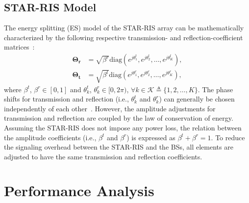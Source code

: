 \documentclass[conference]{IEEEtran}
\begin{document}
\subsection{STAR-RIS Model}
The energy splitting (ES) model of the STAR-RIS array can be mathematically characterized by the following respective transmission- and reflection-coefficient matrices~\cite{mu2021simultaneously}:
\begin{align}
	\mathbf{\Theta_r} & = \sqrt{\beta^r}\text{diag}(e^{j \theta_1^t}, e^{j \theta_2^t}, \dots, e^{j \theta_K^t}), \\
	\mathbf{\Theta_t} & = \sqrt{\beta^t}\text{diag}(e^{j \theta_1^r}, e^{j \theta_2^r}, \dots, e^{j \theta_K^r}),
\end{align}
where $\beta^t$, $\beta^r \in [0, 1]$ and $\theta_k^t$, $\theta_k^r \in [0, 2 \pi)$, $\forall k \in \mathcal{K} \triangleq \{1, 2,\dots,K\}$. The phase shifts for transmission and reflection (i.e., $\theta_k^t$ and $\theta_k^r$) can generally be chosen independently of each other~\cite{9437234}. However, the amplitude adjustments for transmission and reflection are coupled by the law of conservation of energy. Assuming the STAR-RIS does not impose any power loss, the relation between the amplitude coefficients (i.e., $\beta^t$ and $\beta^r$) is expressed as $\beta^t + \beta^r = 1$. To reduce the signaling overhead between the STAR-RIS and the BSs, all elements are adjusted to have the same transmission and reflection coefficients.


\section{Performance Analysis}
\end{document}
